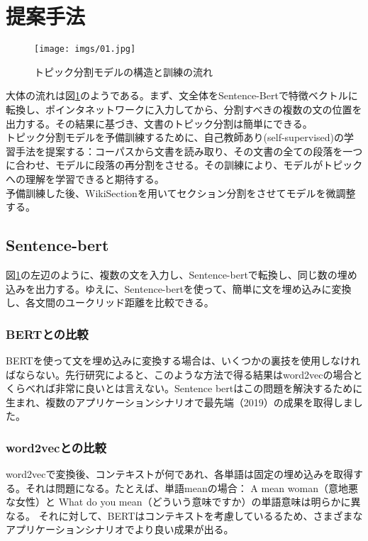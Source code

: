 \documentclass[a4paper]{article}
\begin{document}
\section{提案手法}

\begin{figure}[H]
  \texttt{[image: imgs/01.jpg]}
  \caption{トピック分割モデルの構造と訓練の流れ}
  \label{fig:img1}
\end{figure}

大体の流れは図\ref{fig:img1}のようである。まず、文全体をSentence-Bert\cite{reimers2019sentence}で特徴ベクトルに転換し、ポインタネットワーク\cite{vinyals2015pointer}に入力してから、分割すべきの複数の文の位置を出力する。その結果に基づき、文書のトピック分割は簡単にできる。\\

トピック分割モデルを予備訓練するために、自己教師あり(self-supervised)の学習手法を提案する：コーパスから文書を読み取り、その文書の全ての段落を一つに合わせ、モデルに段落の再分割をさせる。その訓練により、モデルがトピックへの理解を学習できると期待する。\\

予備訓練した後、WikiSectionを用いてセクション分割をさせてモデルを微調整する。\\

\subsection{Sentence-bert}

図\ref{fig:img1}の左辺のように、複数の文を入力し、Sentence-bertで転換し、同じ数の埋め込みを出力する。ゆえに、Sentence-bertを使って、簡単に文を埋め込みに変換し、各文間のユークリッド距離を比較できる。

\subsubsection{BERTとの比較}
BERTを使って文を埋め込みに変換する場合は、いくつかの裏技を使用しなければならない。先行研究によると、このような方法で得る結果はword2vecの場合とくらべれば非常に良いとは言えない。Sentence bertはこの問題を解決するために生まれ、複数のアプリケーションシナリオで最先端（2019）の成果を取得しました。

\subsubsection{word2vecとの比較}

word2vecで変換後、コンテキストが何であれ、各単語は固定の埋め込みを取得する。それは問題になる。たとえば、単語meanの場合： A mean woman（意地悪な女性）と What do you mean（どういう意味ですか）の単語意味は明らかに異なる。 それに対して、BERTはコンテキストを考慮しているるため、さまざまなアプリケーションシナリオでより良い成果が出る。
\end{document}
